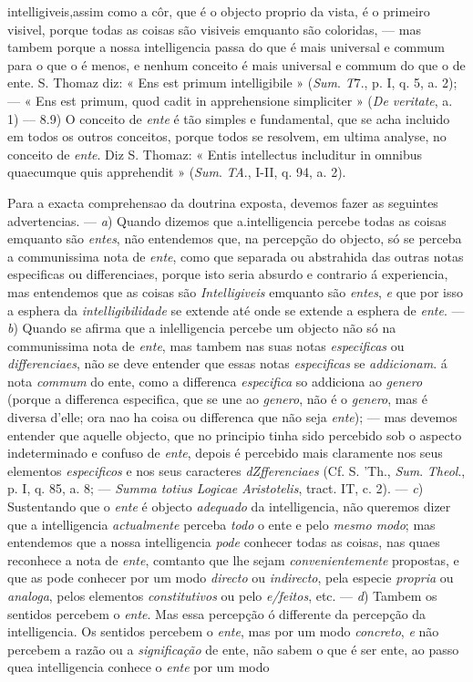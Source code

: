 intelligiveis,assim como a côr, que é o objecto proprio da vista, é o primeiro visivel, porque todas as coisas são visiveis emquanto são coloridas, --- mas tambem porque a nossa intelligencia passa do que é mais universal e commum para o que o é menos, e nenhum conceito é mais universal e commum do que o de ente. S. Thomaz diz: « Ens est primum intelligibile » (\emph{Sum}. \emph{T}7., p. I, q. 5, a. 2); --- « Ens est primum, quod cadit in apprehensione simpliciter » (\emph{De veritate}, a. 1) --- 8.9) O conceito de \emph{ente} é tão simples e fundamental, que se acha incluido em todos os outros conceitos, porque todos se resolvem, em ultima analyse, no conceito de \emph{ente}. Diz S. Thomaz: « Entis intellectus includitur in omnibus quaecumque quis apprehendit » (\emph{Sum}. \emph{TA}., I-II, q. 94, a. 2).\par Para a exacta comprehensao da doutrina exposta, devemos fazer as seguintes advertencias. --- \emph{a}) Quando dizemos que a.intelligencia percebe todas as coisas emquanto são \emph{entes}, não entendemos que, na percepção do objecto, só se perceba a communissima nota de \emph{ente}, como que separada ou abstrahida das outras notas especificas ou differenciaes, porque isto seria absurdo e contrario á experiencia, mas entendemos que as coisas são \emph{Intelligiveis} emquanto são \emph{entes}, \emph{e} que por isso a esphera da \emph{intelligibilidade} se extende até onde se extende a esphera de \emph{ente}. --- \emph{b}) Quando se afirma que a inlelligencia percebe um objecto não só na communissima nota de \emph{ente}, mas tambem nas suas notas \emph{especificas} ou \emph{differenciaes}, não se deve entender que essas notas \emph{especificas} se \emph{addicionam}. á nota \emph{commum} do ente, como a differenca \emph{especifica} so addiciona ao \emph{genero} (porque a differenca especifica, que se une ao \emph{genero}, não é o \emph{genero}, mas é diversa d'elle; ora nao ha coisa ou differenca que não seja \emph{ente}); --- mas devemos entender que aquelle objecto, que no principio tinha sido percebido sob o aspecto indeterminado e confuso de \emph{ente}, depois é percebido mais claramente nos seus elementos \emph{especificos} e nos seus caracteres \emph{dZfferenciaes} (Cf. S. 'Th., \emph{Sum}. \emph{Theol}., p. I, q. 85, a. 8; --- \emph{Summa totius Logicae Aristotelis}, tract. IT, c. 2). --- \emph{c}) Sustentando que o \emph{ente} é objecto \emph{adequado} da intelligencia, não queremos dizer que a intelligencia \emph{actualmente} perceba \emph{todo} o ente e pelo \emph{mesmo modo}; mas entendemos que a nossa intelligencia \emph{pode} conhecer todas as coisas, nas quaes reconhece a nota de \emph{ente}, comtanto que lhe sejam \emph{convenientemente} propostas, e que as pode conhecer por um modo \emph{directo} ou \emph{indirecto}, pela especie \emph{propria} ou \emph{analoga}, pelos elementos \emph{constitutivos} ou pelo \emph{e/feitos}, etc. --- \emph{d}) Tambem os sentidos percebem o \emph{ente}. Mas essa percepção ó differente da percepção da intelligencia. Os sentidos percebem o \emph{ente}, mas por um modo \emph{concreto}, \emph{e} não percebem a razão ou a \emph{significação} de ente, não sabem o que é ser ente, ao passo quea intelligencia conhece o \emph{ente} por um modo 